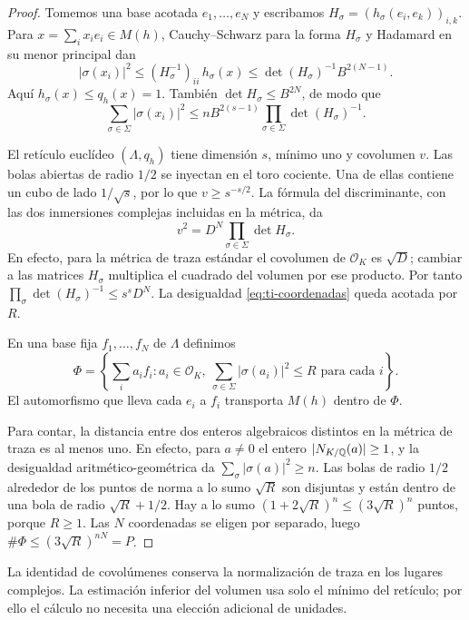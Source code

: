 \begin{proof}
Tomemos una base acotada $e_1,\ldots,e_N$ y escribamos
$H_\sigma=(h_\sigma(e_i,e_k))_{i,k}$.
Para $x=\sum_i x_i e_i\in M(h)$,
Cauchy--Schwarz para la forma $H_\sigma$ y Hadamard
en su menor principal dan
\[
 |\sigma(x_i)|^2
 \le (H_\sigma^{-1})_{ii}\,h_\sigma(x)
 \le \det(H_\sigma)^{-1}B^{2(N-1)}.
\]
Aquí $h_\sigma(x)\le q_h(x)=1$.
También $\det H_\sigma\le B^{2N}$, de modo que
\begin{equation}
 \sum_{\sigma\in\Sigma}|\sigma(x_i)|^2
 \le n B^{2(s-1)}
           \prod_{\sigma\in\Sigma}\det(H_\sigma)^{-1}.
 \label{eq:ti-coordenadas}
\end{equation}

El retículo euclídeo $(\Lambda,q_h)$ tiene dimensión $s$,
mínimo uno y covolumen $v$. Las bolas abiertas de radio
$1/2$ se inyectan en el toro cociente. Una de ellas contiene
un cubo de lado $1/\sqrt{s}$, por lo que
$v\ge s^{-s/2}$.
La fórmula del discriminante, con las dos inmersiones
complejas incluidas en la métrica, da
\[
 v^2=D^N\prod_{\sigma\in\Sigma}\det H_\sigma.
\]
En efecto, para la métrica de traza estándar el covolumen de
$\mathcal O_K$ es $\sqrt D$; cambiar a las matrices
$H_\sigma$ multiplica el cuadrado del volumen por ese producto.
Por tanto
$\prod_\sigma\det(H_\sigma)^{-1}\le s^sD^N$.
La desigualdad \eqref{eq:ti-coordenadas} queda acotada por $R$.

En una base fija $f_1,\ldots,f_N$ de $\Lambda$ definimos
\[
 \Phi=\left\{\sum_i a_i f_i:
       a_i\in\mathcal O_K,\ 
       \sum_{\sigma\in\Sigma}|\sigma(a_i)|^2\le R
       \text{ para cada }i\right\}.
\]
El automorfismo que lleva cada $e_i$ a $f_i$ transporta
$M(h)$ dentro de $\Phi$.

Para contar, la distancia entre dos enteros algebraicos
distintos en la métrica de traza es al menos uno.
En efecto, para $a\ne0$ el entero $|N_{K/\mathbb{Q}}(a)|\ge1$,
y la desigualdad aritmético-geométrica da
$\sum_\sigma|\sigma(a)|^2\ge n$.
Las bolas de radio $1/2$ alrededor de los puntos de norma
a lo sumo $\sqrt R$ son disjuntas y están dentro de una
bola de radio $\sqrt R+1/2$. Hay a lo sumo
$(1+2\sqrt R)^n\le(3\sqrt R)^n$ puntos, porque $R\ge1$.
Las $N$ coordenadas se eligen por separado, luego
$\#\Phi\le(3\sqrt R)^{nN}=P$.
\end{proof}

La identidad de covolúmenes conserva la normalización de
traza en los lugares complejos. La estimación inferior del
volumen usa solo el mínimo del retículo; por ello el cálculo
no necesita una elección adicional de unidades.

